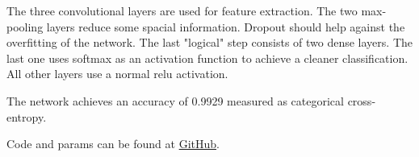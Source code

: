 \documentclass[a4paper, 11pt]{article}
\begin{document}
The three convolutional layers are used for feature extraction.
The two max-pooling layers reduce some spacial information.
Dropout should help against the overfitting of the network.
The last "logical" step consists of two dense layers.
The last one uses softmax as an activation function to achieve a cleaner classification.
All other layers use a normal relu activation.

The network achieves an accuracy of 0.9929 measured as categorical cross-entropy.

Code and params can be found at \href{https://github.com/Flova/DAIS/blob/master/%C3%9Cbung 4/MNIST_Keras.ipynb}{GitHub}.
\end{document}

